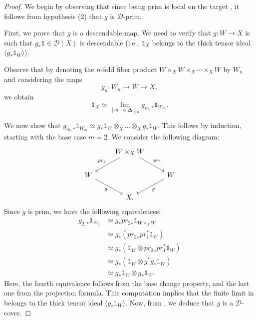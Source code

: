 \documentclass[oneside, hidelinks, 12pt, a4paper,reqno]{amsart}
\newcommand{\bDelta}{\bm{\Delta}} %
\theoremstyle{plain}
\theoremstyle{definition}
\theoremstyle{plain}
\begin{document}
\begin{proof}
    We begin by observing that since being prim is local on the target \cite[Lemma 4.5.7]{heyer20246functorformalismssmoothrepresentations}, it follows from hypothesis (2) that $g$ is $\mathscr{D}$-prim.
    
    First, we prove that $g$ is a descendable map. We need to verify that $g\colon W \to X$ is such that $g_* \mathbb{1} \in \mathscr{D}(X)$ is descendable (i.e., $\mathbb{1}_X$ belongs to the thick tensor ideal $\langle g_* \mathbb{1}_W \rangle$).
    
    Observe that by denoting the $n$-fold fiber product $W\times_X W \times_X \cdots \times_X W$ by $W_n$ and considering the maps
    $$
    g_n \colon  W_n \to W \to X,
    $$
    we obtain
    \begin{equation}\label{eq: limite 1}
        \mathbb{1}_X \simeq \lim_{[m] \in \bDelta_{\leq n}} g_{m,*} \mathbb{1}_{W_m}.
    \end{equation}

    We now show that $g_{m,*} \mathbb{1}_{W_m} \simeq g_* \mathbb{1}_W \otimes_X \dots \otimes_X g_* \mathbb{1}_W$. This follows by induction, starting with the base case $m=2$. We consider the following diagram: 
    $$
    \begin{tikzcd}
    & W \times_X W \arrow[ld, "pr_2"'] \arrow[rd, "pr_1"] & \\
    W \arrow[rd, "g"'] & & W \arrow[ld, "g"] \\
    & X. &
    \end{tikzcd}
    $$
    Since $g$ is prim, we have the following equivalences:
    $$
    \begin{aligned}
    g_{2,*} \mathbb{1}_{W_2} &\simeq g_* {pr_2}_* \mathbb{1}_{W \times_X W} \\ 
    &\simeq g_* ( {pr_2}_* pr_1^* \mathbb{1}_W ) \\
    &\simeq g_* ( \mathbb{1}_W \otimes {pr_2}_* pr_1^* \mathbb{1}_W ) \\
    &\simeq g_* ( \mathbb{1}_W \otimes g^* g_* \mathbb{1}_W ) \\
    &\simeq g_* \mathbb{1}_W \otimes g_* \mathbb{1}_W.
    \end{aligned}
    $$
    Here, the fourth equivalence follows from the base change property, and the last one from the projection formula. This computation implies that the finite limit in  belongs to the thick tensor ideal $\langle g_* \mathbb{1}_W \rangle$. Now, from \cite[Lemma 4.7.4]{heyer20246functorformalismssmoothrepresentations}, we deduce that $g$ is a $\mathscr{D}$-cover. 
\end{proof}
\end{document}
